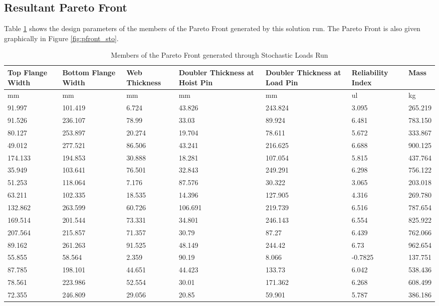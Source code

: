 \subsection{Resultant Pareto Front}
Table \ref{tab:pfront_sto} shows the design parameters of the members of the Pareto Front generated by this solution run. The Pareto Front is also given graphically in Figure \ref{fig:pfront_sto}. 
\begin{table}[!htbp]
\centering
\small
\begin{tabular}{|p{1.5cm}p{1.5cm}p{1.4cm}p{2cm}p{2cm}p{1.5cm}p{1.5cm}|}
\hline
Top Flange Width&Bottom Flange Width&Web Thickness&Doubler Thickness at Hoist Pin&Doubler Thickness at Load Pin&Reliability Index& Mass\\
\hline
mm&mm&mm&mm&mm&ul&kg\\
\hline
91.997&101.419&6.724&43.826&243.824&3.095&265.219\\
91.526&236.107&78.99&33.03&89.924&6.481&783.150\\
80.127&253.897&20.274&19.704&78.611&5.672&333.867\\
49.012&277.521&86.506&43.241&216.625&6.688&900.125\\
174.133&194.853&30.888&18.281&107.054&5.815&437.764\\
35.949&103.641&76.501&32.843&249.291&6.298&756.122\\
51.253&118.064&7.176&87.576&30.322&3.065&203.018\\
63.211&102.335&18.535&14.396&127.905&4.316&269.780\\
132.862&263.599&60.726&106.691&219.739&6.516&787.654\\
169.514&201.544&73.331&34.801&246.143&6.554&825.922\\
207.564&215.857&71.357&30.79&87.27&6.439&762.066\\
89.162&261.263&91.525&48.149&244.42&6.73&962.654\\
55.855&58.564&2.359&90.19&8.066&-0.7825&137.751\\
87.785&198.101&44.651&44.423&133.73&6.042&538.436\\
78.561&223.986&52.554&30.01&171.362&6.268&608.499\\
72.355&246.809&29.056&20.85&59.901&5.787&386.186\\
\hline
\end{tabular}
\caption{Members of the Pareto Front generated through Stochastic Loads Run}
\label{tab:pfront_sto}
\end{table}

